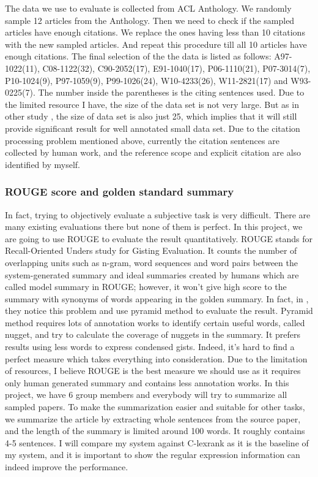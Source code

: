 \documentclass[hyp]{socreport}
\begin{document}
The data we use to evaluate is collected from ACL Anthology. We randomly sample 12 articles from the Anthology. Then we need to check if the sampled articles have enough citations. We replace the ones having less than 10 citations with the new sampled articles. And repeat this procedure till all 10 articles have enough citations. The final selection of the the data is listed as follows:  A97-1022(11), C08-1122(32), C90-2052(17), E91-1040(17), P06-1110(21), P07-3014(7), P10-1024(9), P97-1059(9), P99-1026(24), W10-4233(26), W11-2821(17) and W93-0225(7). The number inside the parentheses is the citing sentences used. Due to the limited resource I have, the size of the data set is not very large. But as in other study \citep{qazvinian2010}, the size of data set is also just 25, which implies that it will still provide significant result for well annotated small data set.  Due to the citation processing problem mentioned above, currently the citation sentences are collected by human work, and the reference scope and explicit citation are also identified by myself.   
 
\subsubsection{ROUGE score and golden standard summary}

In fact, trying to objectively evaluate a subjective task is very difficult. There are many existing evaluations there but none of them is perfect. In this project, we are going to use ROUGE to evaluate the result quantitatively. ROUGE stands for Recall-Oriented Unders study for Gisting Evaluation. It counts the number of overlapping units such as n-gram, word sequences and word pairs between the system-generated summary and ideal summaries created by humans which are called model summary in ROUGE; however, it won't give high score to the summary with synonyms of words appearing in the golden summary. In fact, in \citep{qazvinian2008}, they notice this problem and use pyramid method to evaluate the result. Pyramid method requires lots of annotation works to identify certain useful words, called nugget, and try to calculate the coverage of nuggets in the summary. It prefers results using less words to express condensed gists. Indeed, it's hard to find a perfect measure which takes everything into consideration. Due to the limitation of resources, I believe ROUGE is the best measure we should use as it requires only human generated summary and contains less annotation works. In this project, we have 6 group members and everybody will try to summarize all sampled papers. To make the summarization easier and suitable for other tasks, we summarize the article by extracting whole sentences from the source paper, and the length of the summary is limited around 100 words. It roughly contains 4-5 sentences. I will compare my system against C-lexrank as it is the baseline of my system, and it is important to show the regular expression information can indeed improve the performance.
\end{document}
